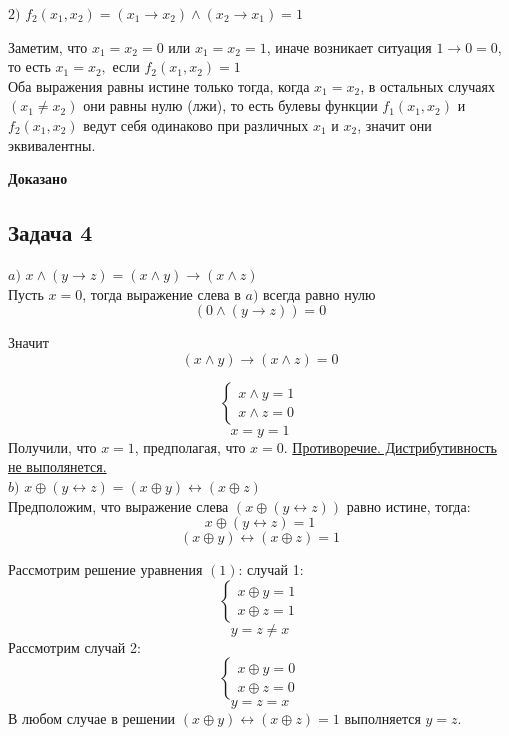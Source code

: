\documentclass[a4paper,14pt]{article} %
\begin{document}
$2)$ $f_2(x_1, x_2)= (x_1\rightarrow x_2) \wedge (x_2\rightarrow x_1)=1$

Заметим, что $x_1 = x_2 =0$ или $x_1 = x_2 =1$, иначе возникает ситуация $1\rightarrow 0 = 0$, то есть $x_1 = x_2,$ если $f_2(x_1, x_2)=1$ \\

Оба выражения равны истине только тогда, когда $x_1 = x_2$, в остальных случаях $(x_1 \neq x_2)$ они равны нулю (лжи), то есть булевы функции $f_1(x_1, x_2)$ и $f_2(x_1, x_2)$ ведут себя одинаково при различных $x_1$ и $x_2$, значит они эквивалентны.


\begin{flushright}
\begin{large}
\textbf {Доказано}
\end{large}
\end{flushright}

\begin{center}
\subsection{Задача 4}
\end{center}


$a)$ $x\wedge (y\rightarrow z) =(x\wedge y)\rightarrow(x\wedge z)$\\

Пусть $x=0$, тогда выражение слева в $a)$ всегда равно нулю \[(0\wedge (y\rightarrow z))=0\]

Значит \[(x\wedge y)\rightarrow(x\wedge z)=0\]

\[\begin{cases}
  x\wedge y = 1\\
  x\wedge z = 0
\end{cases}\]
\[x=y=1\]
Получили, что $x=1$, предполагая, что $x=0$.
 \underline{Противоречие. Дистрибутивность не выполянется.}\\
 $b)$ $x\oplus (y \leftrightarrow z) = (x\oplus y)\leftrightarrow (x\oplus z)$ \\

Предположим, что выражение слева $(x\oplus (y \leftrightarrow z))$ равно истине, тогда:
\begin{equation}x\oplus (y \leftrightarrow z)=1
\end{equation}
\begin{equation}(x\oplus y)\leftrightarrow (x\oplus z)=1
\end{equation}

Рассмотрим решение уравнения $(1)$: случай 1:
\[\begin{cases}
  x\oplus y = 1\\
  x\oplus z = 1
\end{cases}\]
\[y=z\neq x\]
Рассмотрим случай 2:
\[\begin{cases}
  x\oplus y = 0\\
  x\oplus z = 0
\end{cases}\]
\[y=z = x\]
В любом случае в решении $(x\oplus y)\leftrightarrow (x\oplus z)=1$ выполняется $y=z$.
  
\end{document}
